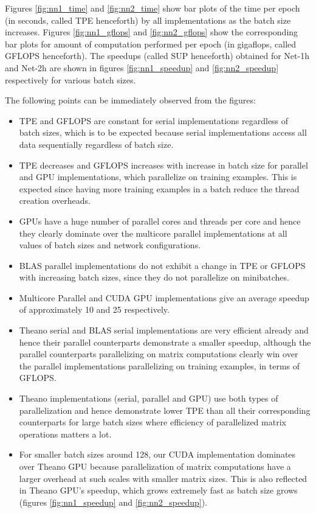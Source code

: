 Figures \ref{fig:nn1_time} and \ref{fig:nn2_time} show bar plots of the time per epoch (in seconds, called TPE henceforth) by all implementations as the batch size increases.
Figures \ref{fig:nn1_gflops} and \ref{fig:nn2_gflops} show the corresponding bar plots for amount of computation performed per epoch (in gigaflops, called GFLOPS henceforth).
The speedups (called SUP henceforth) obtained for Net-1h and Net-2h are shown in figures \ref{fig:nn1_speedup} and \ref{fig:nn2_speedup} respectively for various batch sizes.

The following points can be immediately observed from the figures:
\begin{itemize}
\item TPE and GFLOPS are constant for serial implementations regardless of batch sizes, which is to be expected because serial implementations access all data sequentially regardless of batch size.
\item TPE decreases and GFLOPS increases with increase in batch size for parallel and GPU implementations, which parallelize on training examples. This is expected since having more training examples in a batch reduce the thread creation overheads.
\item GPUs have a huge number of parallel cores and threads per core and hence they clearly dominate over the multicore parallel implementations at all values of batch sizes and network configurations.
\item BLAS parallel implementations do not exhibit a change in TPE or GFLOPS with increasing batch sizes, since they do not parallelize on minibatches.
\item Multicore Parallel and CUDA GPU implementations give an average speedup of approximately 10 and 25 respectively.
\item Theano serial and BLAS serial implementations are very efficient already and hence their parallel counterparts demonstrate a smaller speedup, although the parallel counterparts parallelizing on matrix computations clearly win over the parallel implementations parallelizing on training examples, in terms of GFLOPS.
\item Theano implementations (serial, parallel and GPU) use both types of parallelization and hence demonstrate lower TPE than all their corresponding counterparts for large batch sizes where efficiency of parallelized matrix operations matters a lot.
\item For smaller batch sizes around 128, our CUDA implementation dominates over Theano GPU because parallelization of matrix computations have a larger overhead at such scales with smaller matrix sizes. This is also reflected in Theano GPU's speedup, which grows extremely fast as batch size grows (figures \ref{fig:nn1_speedup} and \ref{fig:nn2_speedup}).
\end{itemize}

